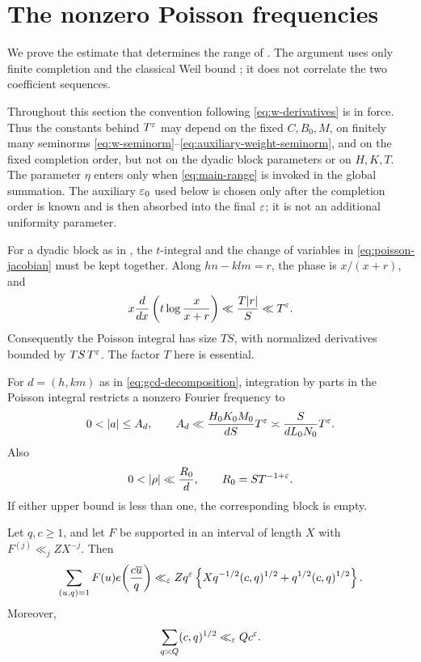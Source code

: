 \section{The nonzero Poisson frequencies}
\label{sec:nonzero}

We prove the estimate that determines the range of .  The
argument uses only finite completion and the classical Weil bound
\cite{Weil1948}; it does not correlate the two coefficient sequences.

Throughout this section the convention following \eqref{eq:w-derivatives}
is in force.  Thus the constants behind $T^\varepsilon$ may depend on the fixed
$C,B_0,M$, on finitely many seminorms
\eqref{eq:w-seminorm}--\eqref{eq:auxiliary-weight-seminorm}, and on the fixed
completion order, but not on the dyadic block parameters or on $H,K,T$.
The parameter $\eta$ enters only when \eqref{eq:main-range} is invoked in the
global summation.  The auxiliary $\varepsilon_0$ used below is chosen only after the
completion order is known and is then absorbed into the final $\varepsilon$; it is
not an additional uniformity parameter.

For a dyadic block as in , the $t$-integral and the change
of variables in \eqref{eq:poisson-jacobian} must be kept together.  Along
$hn-klm=r$, the phase is $x/(x+r)$, and
\begin{equation}\label{eq:phase-derivative}
 x\frac{d}{dx}\left(t\log\frac{x}{x+r}\right)
 \ll\frac{T|r|}{S}\ll T^\varepsilon.
\end{equation}
Consequently the Poisson integral has size $TS$, with normalized derivatives
bounded by $TS\,T^\varepsilon$.  The factor $T$ here is essential.

For $d=(h,km)$ as in \eqref{eq:gcd-decomposition}, integration by parts in
the Poisson integral restricts a nonzero Fourier frequency to
\begin{equation}\label{eq:a-range}
 0<|a|\leq A_d,\qquad
 A_d\ll\frac{H_0K_0M_0}{dS}T^\eps
      \asymp\frac{S}{dL_0N_0}T^\eps.
\end{equation}
Also
\begin{equation}\label{eq:rho-range}
                  0<|\rho|\ll \frac{R_0}{d},\qquad
                  R_0=ST^{-1+\eps}.
\end{equation}
If either upper bound is less than one, the corresponding block is empty.

\begin{lemma}\label{lem:reciprocal-sum}
Let $q,c\geq1$, and let $F$ be supported in an interval of length $X$ with
$F^{(j)}\ll_j ZX^{-j}$.  Then
\begin{equation}\label{eq:reciprocal-sum}
 \sum_{(u,q)=1}F(u)e\!\left(\frac{c\overline u}{q}\right)
 \ll_\varepsilon Zq^\varepsilon
 \left\{
 Xq^{-1/2}(c,q)^{1/2}
 +q^{1/2}(c,q)^{1/2}
 \right\}.
\end{equation}
Moreover,
\begin{equation}\label{eq:gcd-average}
                  \sum_{q\asymp Q}(c,q)^{1/2}
                  \ll_\varepsilon Qc^\varepsilon.
\end{equation}
\end{lemma}


